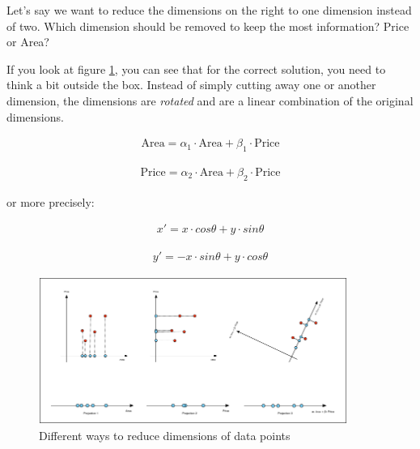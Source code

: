 \documentclass[11pt]{article}
\begin{document}
Let's say we want to reduce the dimensions on the right to one dimension instead of two. Which dimension should be removed to keep the most information? Price or Area?

\vspace{10px}

If you look at figure \ref{fig:dimred}, you can see that for the correct solution, you need to think a bit outside the box. Instead of simply cutting away one or another dimension, the dimensions are \textit{rotated} and are a linear combination of the original dimensions.

\vspace{-20px}

\begin{align*}
    \text{Area} = \alpha_1 \cdot \text{Area} + \beta_1 \cdot \text{Price}
\end{align*}

\vspace{-30px}

\begin{align*}
    \text{Price} = \alpha_2 \cdot \text{Area} + \beta_2 \cdot \text{Price}
\end{align*}

or more precisely:

\noindent\begin{minipage}{.5\linewidth}
    \begin{align*}
        x' = x \cdot cos \theta + y \cdot sin \theta
    \end{align*}
\end{minipage}%
\noindent\begin{minipage}{.5\linewidth}
    \begin{align*}
        y' = -x \cdot sin \theta + y \cdot cos \theta
    \end{align*}
\end{minipage}

\begin{figure}[htb!]
    \centering
    \includegraphics[keepaspectratio,width=0.9\textwidth]{data_projections}
    \caption{Different ways to reduce dimensions of data points}
    \label{fig:dimred}
\end{figure}
\end{document}
